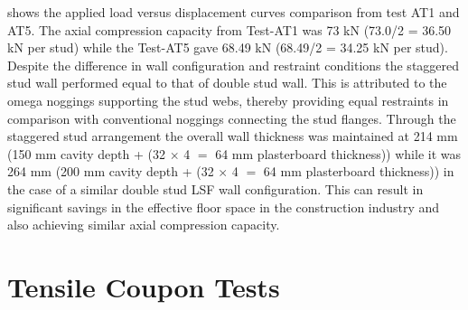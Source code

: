  shows the applied load versus displacement curves comparison from test AT1 and AT5. The axial compression capacity from Test-AT1 was 73 kN (73.0/2 = 36.50 kN per stud) while the Test-AT5 gave 68.49 kN (68.49/2 = 34.25 kN per stud). Despite the difference in wall configuration and restraint conditions the staggered stud wall performed equal to that of double stud wall. This is attributed to the omega noggings supporting the stud webs, thereby providing equal restraints in comparison with conventional noggings connecting the stud flanges. Through the staggered stud arrangement the overall wall thickness was maintained at 214 mm (150 mm cavity depth + (32 $\times$ 4 $=$ 64 mm plasterboard thickness)) while it was 264 mm (200 mm cavity depth + (32 $\times$ 4 $=$ 64 mm plasterboard thickness)) in the case of a similar double stud LSF wall configuration. This can result in significant savings in the effective floor space in the construction industry and also achieving similar axial compression capacity. 

\section{Tensile Coupon Tests}\label{sec:tensile-coupon}


